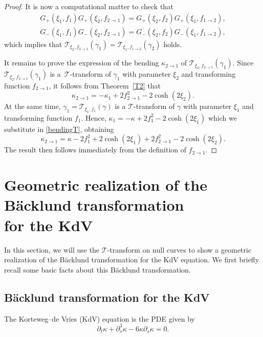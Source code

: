 \documentclass[pdftex]{sigma}
\numberwithin{equation}{section}
\def\bending{\kappa}
\begin{document}
\begin{proof}
	It is now a computational matter to check that
	\begin{gather*}
		G_+(\xi_1,f_1)G_+(\xi_2,f_{2\to 1})=G_+(\xi_2,f_2)G_+(\xi_1,f_{1\to 2}),\\
		G_-(\xi_1,f_1)G_-(\xi_2,f_{2\to 1})=G_-(\xi_2,f_2)G_-(\xi_1,f_{1\to 2}),
	\end{gather*}
	which implies that $\mathcal{T}_{\xi_2,f_{2\to 1}}(\gamma_1)=\mathcal{T}_{\xi_1,f_{1\to 2}}(\gamma_2)$ holds.
	
	It remains to prove the expression of the bending $\bending_{2\to 1}$ of $\mathcal{T}_{\xi_2,f_{2\to 1}}(\gamma_1)$. Since $\mathcal{T}_{\xi_2,f_{2\to 1}}(\gamma_1)$ is a~$\mathcal{T}$-transform of $\gamma_1$ with parameter $\xi_2$ and transforming function $f_{2\to 1}$, it follows from Theorem~\ref{T2} that
	\begin{equation}\label{bendingT}
		\bending_{2\to 1}=-\bending_1+2f_{2\to 1}^2-2\cosh(2\xi_2).
	\end{equation}
	At the same time, $\gamma_1=\mathcal{T}_{\xi_1,f_1}(\gamma)$ is a $\mathcal{T}$-transform of $\gamma$ with parameter $\xi_1$ and transforming function $f_1$. Hence, $\bending_1=-\bending+2f_1^2-2\cosh(2\xi_1)$ which we substitute in \eqref{bendingT}, obtaining
	\begin{equation*}\bending_{2\to 1}=\bending-2f_1^2+2\cosh(2\xi_1)+2f_{2\to 1}^2-2\cosh(2\xi_2).\end{equation*}
	The result then follows immediately from the definition of $f_{2\to 1}$.
\end{proof}

\section{Geometric realization of the B\"{a}cklund transformation \\ for the KdV}\label{section4}

In this section, we will use the $\mathcal{T}$-transform on null curves to show a geometric realization of the B\"{a}cklund transformation for the KdV equation. We first briefly recall some basic facts about this B\"{a}cklund transformation.

\subsection{B\"{a}cklund transformation for the KdV}\label{section4.1}

The Korteweg--de Vries (KdV) equation is the PDE given by
\begin{equation}\label{KdV2}
	\partial_t\bending+\partial_s^3\bending-6\bending \partial_s\bending=0.
\end{equation}
\end{document}
